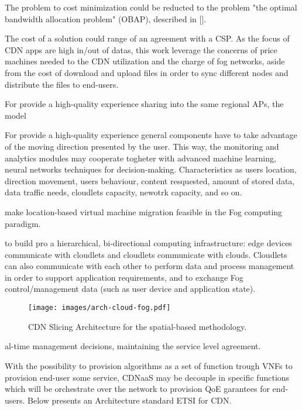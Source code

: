 The problem to cost minimization could be reducted to the problem "the optimal bandwidth allocation problem" (OBAP), described in [].

The cost of a solution could range of an agreement with a CSP. As the focus of CDN apps are high in/out of datas, this work leverage the concerns of price machines needed to the CDN utilization and the charge of fog  networks, aside from the cost of download and upload files in order to sync different nodes and distribute the files to end-users.

For provide a high-quality experience sharing into the same regional APs, the model 

For provide a high-quality experience general components have to take advantage of the moving direction presented by the user. This way, the monitoring and analytics modules may cooperate togheter with advanced machine learning, neural networks techniques for decision-making. Characteristics as users location, direction movement, users behaviour, content resquested, amount of stored data, data traffic needs, cloudlets capacity, newotrk capacity, and so on.

make location-based virtual machine migration feasible in the Fog computing paradigm.

to build pro a hierarchical, bi-directional computing infrastructure: edge devices communicate with cloudlets and cloudlets communicate with clouds. Cloudlets can also communicate with each other to perform data and process management in order to support application requirements, and to exchange Fog control/management data (such as user device and application state).

\begin{figure*}
	\centering%
    \texttt{[image: images/arch-cloud-fog.pdf]}
	\caption{CDN Slicing Architecture for the spatial-based methodology.}
    \label{fig:intro}
\end{figure*}



al-time management decisions, maintaining the service level agreement.

With the possibility to provision algorithms as a set of function trough VNFs to provision end-user  some service, CDNaaS may be decouple in specific functions which will be orchestrate over the network to provision QoE garantees for end-users. Below presents an Architecture standard ETSI for CDN.

